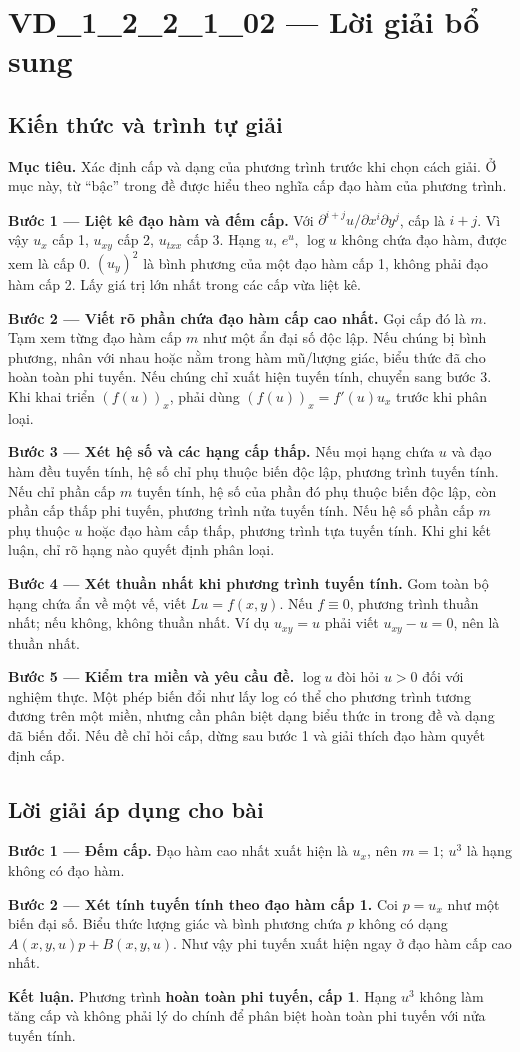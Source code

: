 \documentclass[10pt,a4paper]{article}
\begin{document}
\section*{VD\_1\_2\_2\_1\_02 — Lời giải bổ sung}
\subsection*{Kiến thức và trình tự giải}
\textbf{Mục tiêu.} Xác định cấp và dạng của phương trình trước khi chọn cách giải. Ở mục này, từ “bậc” trong đề được hiểu theo nghĩa cấp đạo hàm của phương trình.

\textbf{Bước 1 — Liệt kê đạo hàm và đếm cấp.} Với $\partial^{i+j}u/\partial x^i\partial y^j$, cấp là $i+j$. Vì vậy $u_x$ cấp 1, $u_{xy}$ cấp 2, $u_{txx}$ cấp 3. Hạng $u$, $e^u$, $\log u$ không chứa đạo hàm, được xem là cấp 0. $(u_y)^2$ là bình phương của một đạo hàm cấp 1, không phải đạo hàm cấp 2. Lấy giá trị lớn nhất trong các cấp vừa liệt kê.

\textbf{Bước 2 — Viết rõ phần chứa đạo hàm cấp cao nhất.} Gọi cấp đó là $m$. Tạm xem từng đạo hàm cấp $m$ như một ẩn đại số độc lập. Nếu chúng bị bình phương, nhân với nhau hoặc nằm trong hàm mũ/lượng giác, biểu thức đã cho hoàn toàn phi tuyến. Nếu chúng chỉ xuất hiện tuyến tính, chuyển sang bước 3. Khi khai triển $(f(u))_x$, phải dùng $(f(u))_x=f'(u)u_x$ trước khi phân loại.

\textbf{Bước 3 — Xét hệ số và các hạng cấp thấp.} Nếu mọi hạng chứa $u$ và đạo hàm đều tuyến tính, hệ số chỉ phụ thuộc biến độc lập, phương trình tuyến tính. Nếu chỉ phần cấp $m$ tuyến tính, hệ số của phần đó phụ thuộc biến độc lập, còn phần cấp thấp phi tuyến, phương trình nửa tuyến tính. Nếu hệ số phần cấp $m$ phụ thuộc $u$ hoặc đạo hàm cấp thấp, phương trình tựa tuyến tính. Khi ghi kết luận, chỉ rõ hạng nào quyết định phân loại.

\textbf{Bước 4 — Xét thuần nhất khi phương trình tuyến tính.} Gom toàn bộ hạng chứa ẩn về một vế, viết $Lu=f(x,y)$. Nếu $f\equiv0$, phương trình thuần nhất; nếu không, không thuần nhất. Ví dụ $u_{xy}=u$ phải viết $u_{xy}-u=0$, nên là thuần nhất.

\textbf{Bước 5 — Kiểm tra miền và yêu cầu đề.} $\log u$ đòi hỏi $u>0$ đối với nghiệm thực. Một phép biến đổi như lấy log có thể cho phương trình tương đương trên một miền, nhưng cần phân biệt dạng biểu thức in trong đề và dạng đã biến đổi. Nếu đề chỉ hỏi cấp, dừng sau bước 1 và giải thích đạo hàm quyết định cấp.
\subsection*{Lời giải áp dụng cho bài}
\textbf{Bước 1 — Đếm cấp.} Đạo hàm cao nhất xuất hiện là $u_x$, nên $m=1$; $u^3$ là hạng không có đạo hàm.

\textbf{Bước 2 — Xét tính tuyến tính theo đạo hàm cấp 1.} Coi $p=u_x$ như một biến đại số. Biểu thức lượng giác và bình phương chứa $p$ không có dạng $A(x,y,u)p+B(x,y,u)$. Như vậy phi tuyến xuất hiện ngay ở đạo hàm cấp cao nhất.

\textbf{Kết luận.} Phương trình \textbf{hoàn toàn phi tuyến, cấp 1}. Hạng $u^3$ không làm tăng cấp và không phải lý do chính để phân biệt hoàn toàn phi tuyến với nửa tuyến tính.
\end{document}
